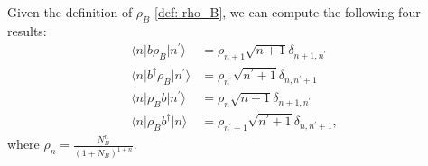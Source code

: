 \documentclass[../../note.tex]{subfiles}
\begin{document}
\begin{lemma}
\label{lemma: four results}
    Given the definition of $\rho_B$ \ref{def: rho_B}, we can compute the following four results:
    \begin{align}
        \langle n \vert b \rho_B \vert n^\prime \rangle 
        &= \rho_{n+1} \sqrt{n+1} \delta_{n+1, n^\prime} \\
        \langle n \vert b^\dagger \rho_B \vert n^\prime \rangle 
        &= \rho_{n^\prime} \sqrt{n^\prime + 1} \delta_{n, n^\prime + 1} \\
        \langle n \vert \rho_B b \vert n^\prime \rangle 
        &= \rho_n \sqrt{n+1} \delta_{n+1, n^\prime} \\
        \langle n \vert \rho_B b^\dagger \vert n \rangle 
        &= \rho_{n^\prime + 1} \sqrt{n^\prime + 1} \delta_{n, n^\prime + 1},
    \end{align}
    where $\rho_n = \frac{N_B^n}{(1 + N_B)^{1+n}}$.
\end{lemma}
\end{document}
